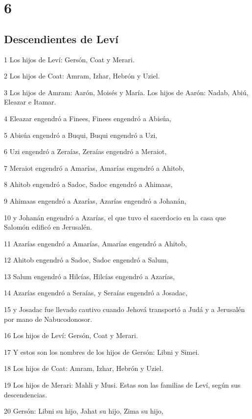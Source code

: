 \chapter{6}

\section*{Descendientes de Leví}

\par 1 Los hijos de Leví: Gersón, Coat y Merari.
\par 2 Los hijos de Coat: Amram, Izhar, Hebrón y Uziel.
\par 3 Los hijos de Amram: Aarón, Moisés y María. Los hijos de Aarón: Nadab, Abiú, Eleazar e Itamar.
\par 4 Eleazar engendró a Finees, Finees engendró a Abisúa,
\par 5 Abisúa engendró a Buqui, Buqui engendró a Uzi,
\par 6 Uzi engendró a Zeraías, Zeraías engendró a Meraiot,
\par 7 Meraiot engendró a Amarías, Amarías engendró a Ahitob,
\par 8 Ahitob engendró a Sadoc, Sadoc engendró a Ahimaas,
\par 9 Ahimaas engendró a Azarías, Azarías engendró a Johanán,
\par 10 y Johanán engendró a Azarías, el que tuvo el sacerdocio en la casa que Salomón edificó en Jerusalén.
\par 11 Azarías engendró a Amarías, Amarías engendró a Ahitob,
\par 12 Ahitob engendró a Sadoc, Sadoc engendró a Salum,
\par 13 Salum engendró a Hilcías, Hilcías engendró a Azarías,
\par 14 Azarías engendró a Seraías, y Seraías engendró a Josadac,
\par 15 y Josadac fue llevado cautivo cuando Jehová transportó a Judá y a Jerusalén por mano de Nabucodonosor.
\par 16 Los hijos de Leví: Gersón, Coat y Merari.
\par 17 Y estos son los nombres de los hijos de Gersón: Libni y Simei.
\par 18 Los hijos de Coat: Amram, Izhar, Hebrón y Uziel.
\par 19 Los hijos de Merari: Mahli y Musi. Estas son las familias de Leví, según sus descendencias. 
\par 20 Gersón: Libni su hijo, Jahat su hijo, Zima su hijo,
